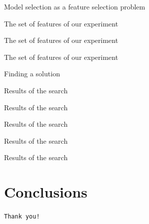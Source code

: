 \documentclass{beamer}
\begin{document}
\begin{frame}{Model selection as a feature selection problem}
\end{frame}

\begin{frame}{The set of features of our experiment}
\end{frame}

\begin{frame}{The set of features of our experiment}
\end{frame}

\begin{frame}{The set of features of our experiment}
\end{frame}

\begin{frame}{Finding a solution}
\end{frame}

\begin{frame}{Results of the search}
\end{frame}

\begin{frame}{Results of the search}
\end{frame}

\begin{frame}{Results of the search}
\end{frame}

\begin{frame}{Results of the search}
\end{frame}

\begin{frame}{Results of the search}
\end{frame}

\section{Conclusions}

\begin{frame}{}
\begin{center}
    \texttt{Thank you!}
\end{center}
\end{frame}
\end{document}
